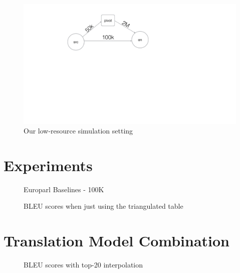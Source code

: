 \begin{figure}
	\small
	\centering
	\includegraphics[trim=2cm 4cm 4cm 4cm, height=0.5\textheight]{files/Figures/Our.jpg} 
	\caption{Our low-resource simulation setting}
	\label{fig:our_setting}
\end{figure}



\section{Experiments}
\begin{figure}[ht]
	\small
	\centering

	
	\label{table:eparlbaselines}
	\caption{Europarl Baselines - 100K}
\end{figure}

 \begin{figure}[ht]
 	\small
 	\centering
	 
	\label{table:eparltopn}
	\caption{BLEU scores when just using the triangulated table}
 \end{figure}


\section{Translation Model Combination}

\begin{figure}[ht]
	\small
	\centering
	
	\label{table:eparltopninter}
	\caption{BLEU scores with top-20 interpolation}
\end{figure}










